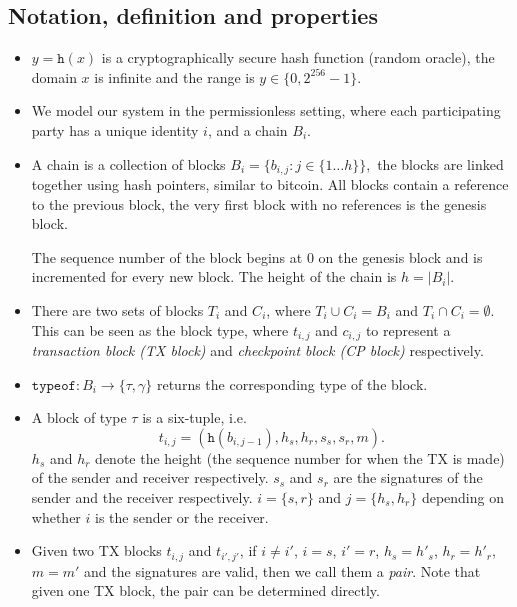 \subsection{Notation, definition and properties}
\begin{itemize}

\item $y = \texttt{h}(x)$ is a cryptographically secure hash function (random
  oracle), the domain $x$ is infinite and the range is $y \in \{0, 2^{256}-1\}$.

\item We model our system in the permissionless setting, where each
  participating party has a unique identity $i$, and a chain $B_i$.

\item A chain is a collection of blocks
  $B_i = \{b_{i,j} : j \in \{1 \dots h\} \},$
  the blocks are linked together using hash pointers, similar to bitcoin. All
  blocks contain a reference to the previous block, the very first block with no
  references is the genesis block.

  The sequence number of the block begins at 0 on the genesis block and is
  incremented for every new block. The height of the chain is $h = |B_i|$.

\item There are two sets of blocks $T_i$ and $C_i$, where $T_i \cup
  C_i = B_i$ and $T_i \cap C_i = \emptyset$. This can be seen as the
  block type, where $t_{i,j}$ and $c_{i,j}$ to represent a
  \emph{transaction block (TX block)} and \emph{checkpoint block (CP block)}
  respectively.

\item $\texttt{typeof}: B_i \rightarrow \{ \tau, \gamma \}$ returns the
  corresponding type of the block.

\item A block of type $\tau$ is a six-tuple, i.e. $$t_{i,j} =
  (\texttt{h}(b_{i,j-1}), h_s, h_r, s_s, s_r, m).$$ $h_s$ and $h_r$ denote the
  height (the sequence number for when the TX is made) of the sender and
  receiver respectively. $s_s$ and $s_r$ are the signatures of the sender and
  the receiver respectively. $i = \{s, r\}$ and $j = \{h_s, h_r\}$ depending on
  whether $i$ is the sender or the receiver.

\item Given two TX blocks $t_{i,j}$ and $t_{i',j'}$, if $i \ne i'$, $i = s$, $i'
  = r$, $h_s = h'_s$, $h_r = h'_r$, $m = m'$ and the signatures are valid, then
  we call them a \emph{pair}. Note that given one TX block, the pair can be
  determined directly.


\end{itemize}
